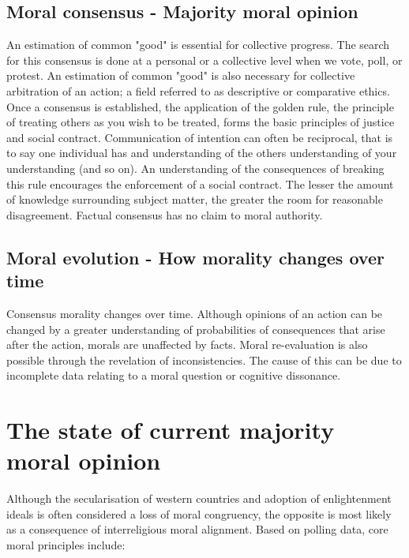 \subsection{Moral consensus - Majority moral opinion}
An estimation of common "good" is essential for collective progress.
The search for this consensus is done at a personal or a collective level when we vote, poll, or protest. 
An estimation of common "good" is also necessary for collective arbitration of an action; a field referred to as descriptive or comparative ethics.
Once a consensus is established, the application of the golden rule, the principle of treating others as you wish to be treated, forms the basic principles of justice and social contract.
Communication of intention can often be reciprocal, that is to say one individual has and understanding of the others understanding of your understanding (and so on).
An understanding of the consequences of breaking this rule encourages the enforcement of a social contract.
The lesser the amount of knowledge surrounding subject matter, the greater the room for reasonable disagreement. 
Factual consensus has no claim to moral authority.

\subsection{Moral evolution - How morality changes over time}
Consensus morality changes over time.
Although opinions of an action can be changed by a greater understanding of probabilities of consequences that arise after the action, morals are unaffected by facts.
Moral re-evaluation is also possible through the revelation of inconsistencies.
The cause of this can be due to incomplete data relating to a moral question or cognitive dissonance.

\section{The state of current majority moral opinion}
Although the secularisation of western countries and adoption of enlightenment ideals is often considered a loss of moral congruency, the opposite is most likely as a consequence of interreligious moral alignment.
Based on polling data, core moral principles include:

